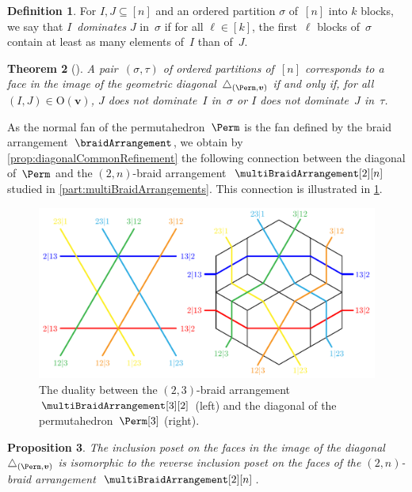 \documentclass{amsart}
\newcommand{\darkblue}{\color{darkblue}} %
\newtheorem{theorem}{Theorem}[section]
\newtheorem{proposition}[theorem]{Proposition}
\theoremstyle{definition}
\newtheorem{definition}[theorem]{Definition}
\renewcommand{\b}[1]{{\boldsymbol{#1}}} %
\newcommand{\Or}{\mathrm{O}} %
\newcommand{\defn}[1]{\textsl{\darkblue #1}} %
\renewcommand{\b}[1]{\boldsymbol{#1}} %
\begin{document}
\begin{definition}
	\label{def:domination}
For $I,J \subseteq [n]$ and an ordered partition $\sigma$ of~$[n]$ into $k$ blocks, we say that $I$~\defn{dominates} $J$ in~$\sigma$ if for all $\ell \in [k]$, the first~$\ell$ blocks of~$\sigma$ contain at least as many elements of~$I$ than of~$J$.
\end{definition}

\begin{theorem}[{\cite[Thm.~3.16]{LaplanteAnfossi}}]
\label{thm:IJ-description}
A pair~$(\sigma, \tau)$ of ordered partitions of~$[n]$ corresponds to a face in the image of the geometric diagonal~$\triangle_{(\Perm, \b{v})}$ if and only if, for all~$(I,J) \in \Or(\b{v})$, $J$ does not dominate~$I$ in~$\sigma$ or $I$ does not dominate~$J$ in~$\tau$.
\end{theorem}

As the normal fan of the permutahedron~$\Perm$ is the fan defined by the braid arrangement~$\braidArrangement$, we obtain by \cref{prop:diagonalCommonRefinement} the following connection between the diagonal of~$\Perm$ and the $(2,n)$-braid arrangement~$\multiBraidArrangement[2][n]$ studied in \cref{part:multiBraidArrangements}.
This connection is illustrated in \cref{fig:diagonalPermutahedron1}.
%
\begin{figure}
	\centerline{\includegraphics[scale=.7]{diagonalPermutahedron1}}
	\caption{The duality between the $(2,3)$-braid arrangement~$\multiBraidArrangement[3][2]$ (left) and the diagonal of the permutahedron~$\Perm[3]$ (right).}
	\label{fig:diagonalPermutahedron1}
\end{figure}

\begin{proposition}
\label{prop:diagonalPermutahedraMultiBraidArrangements}
The inclusion poset on the faces in the image of the diagonal~$\triangle_{(\Perm, \b{v})}$ is isomorphic to the reverse inclusion poset on the faces of the $(2,n)$-braid arrangement~$\multiBraidArrangement[2][n]$. 
\end{proposition}
\end{document}
